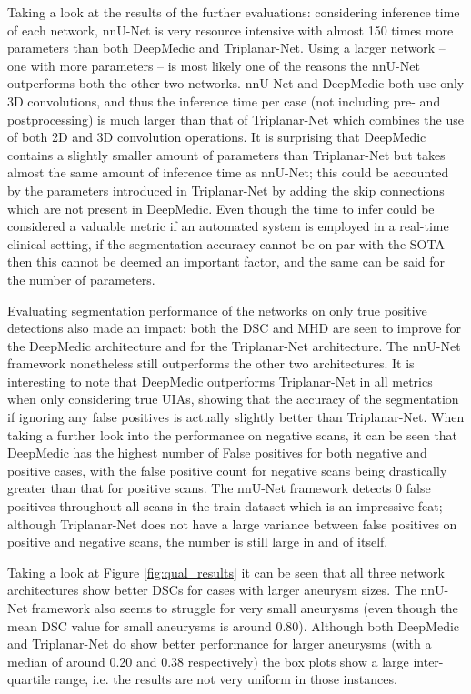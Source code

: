 Taking a look at the results of the further evaluations: considering inference time of each network, nnU-Net is very resource intensive with almost 150 times more parameters than both DeepMedic and Triplanar-Net. Using a larger network -- one with more parameters -- is most likely one of the reasons the nnU-Net outperforms both the other two networks. nnU-Net and DeepMedic both use only 3D convolutions, and thus the inference time per case (not including pre- and postprocessing) is much larger than that of Triplanar-Net which combines the use of both 2D and 3D convolution operations. It is surprising that DeepMedic contains a slightly smaller amount of parameters than Triplanar-Net but takes almost the same amount of inference time as nnU-Net; this could be accounted by the parameters introduced in Triplanar-Net by adding the skip connections which are not present in DeepMedic. Even though the time to infer could be considered a valuable metric if an automated system is employed in a real-time clinical setting, if the segmentation accuracy cannot be on par with the SOTA then this cannot be deemed an important factor, and the same can be said for the number of parameters.

Evaluating segmentation performance of the networks on only true positive detections also made an impact: both the DSC and MHD are seen to improve for the DeepMedic architecture and for the Triplanar-Net architecture. The nnU-Net framework nonetheless still outperforms the other two architectures. It is interesting to note that DeepMedic outperforms Triplanar-Net in all metrics when only considering true UIAs, showing that the accuracy of the segmentation if ignoring any false positives is actually slightly better than Triplanar-Net. When taking a further look into the performance on negative scans, it can be seen that DeepMedic has the highest number of False positives for both negative and positive cases, with the false positive count for negative scans being drastically greater than that for positive scans. The nnU-Net framework detects 0 false positives throughout all scans in the train dataset which is an impressive feat; although Triplanar-Net does not have a large variance between false positives on positive and negative scans, the number is still large in and of itself. 

Taking a look at Figure \ref{fig:qual_results} it can be seen that all three network architectures show better DSCs for cases with larger aneurysm sizes. The nnU-Net framework also seems to struggle for very small aneurysms (even though the mean DSC value for small aneurysms is around 0.80). Although both DeepMedic and Triplanar-Net do show better performance for larger aneurysms (with a median of around 0.20 and 0.38 respectively) the box plots show a large inter-quartile range, i.e. the results are not very uniform in those instances.

